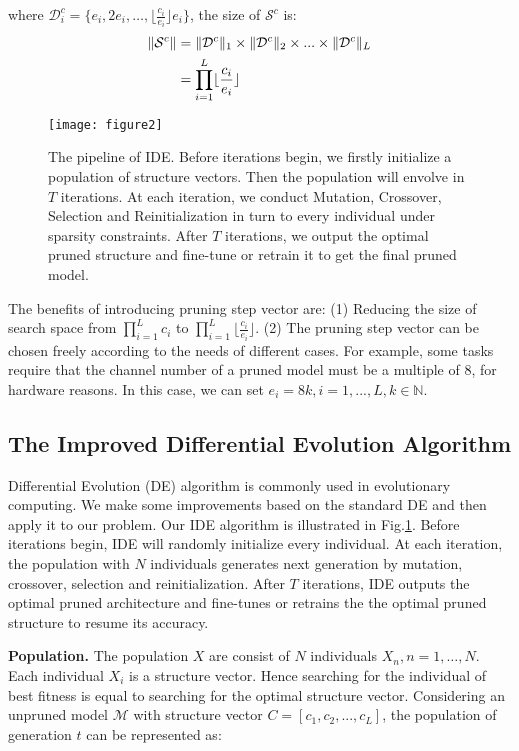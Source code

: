 \documentclass[final]{cvpr}
\begin{document}
\noindent where $\mathcal{D}^c_i=\{e_i,2e_i,…,\lfloor \frac{c_i}{e_i} \rfloor e_i\}$, the size of $\mathcal{S}^{c}$ is:
\begin{align}
    \|\mathcal{S}^{c}\| & = \|\mathcal{D}^c\|_1 \times \|\mathcal{D}^c\|_2 \times ... \times \|\mathcal{D}^c\|_L \notag\\
    & = \prod_{i=1}^{L}\lfloor \frac{c_i}{e_i} \rfloor \label{eq6}
\end{align}

\begin{figure}[t]
    \centering
    \texttt{[image: figure2]} 
    \caption{
        The pipeline of IDE. Before iterations begin, we firstly initialize a population of structure vectors. Then the population will envolve in $T$ iterations. At each iteration, 
        we conduct Mutation, Crossover, Selection and Reinitialization in turn to every individual under sparsity constraints. After $T$ iterations, we output the optimal pruned structure and 
        fine-tune or retrain it to get the final pruned model.
    }
    \label{fig2}
\end{figure}

The benefits of introducing pruning step vector are: (1) Reducing the size of search space from $\prod_{i=1}^{L}c_i$ to 
$\prod_{i=1}^{L}\lfloor \frac{c_i}{e_i} \rfloor$. (2) The pruning step vector can be chosen freely according to the needs 
of different cases. For example, some tasks require that the channel number of a pruned model must be a multiple of 8, for hardware reasons. 
In this case, we can set $e_i = 8k, i=1,...,L, k \in \mathbb{N}$.

\subsection{The Improved Differential Evolution Algorithm}

Differential Evolution (DE) algorithm \cite{storn1997differential} is commonly used in evolutionary 
computing. We make some improvements based on the standard DE and then apply it to our problem. 
Our IDE algorithm is illustrated in Fig.\ref{fig2}. 
Before iterations begin, IDE will randomly initialize every individual. At each iteration, the population with $N$ individuals generates next generation by 
mutation, crossover, selection and reinitialization. After $T$ iterations, IDE outputs the optimal pruned architecture and fine-tunes or retrains the 
the optimal pruned structure to resume its accuracy.

\textbf{Population.} The population $X$ are consist of $N$ individuals $X_n,n=1,…,N$. Each individual $X_i$ is a 
structure vector. Hence searching for the individual of best fitness is equal to searching for the optimal structure vector. 
Considering an unpruned model $\mathcal{M}$ with structure vector $C=[c_1, c_2,..., c_L]$, the population of 
generation $t$ can be represented as:
\end{document}
